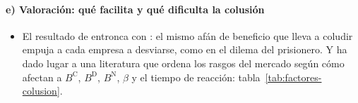 \documentclass[11pt]{article}
\begin{document}
\paragraph{e) Valoración: qué facilita y qué dificulta la colusión}

\begin{itemize}
\item El resultado de  entronca con \textcite{Stigler1964Theory}: el mismo afán de beneficio que lleva a coludir empuja a cada empresa a desviarse, como en el dilema del prisionero. Y ha dado lugar a una literatura que ordena los rasgos del mercado según cómo afectan a $B^{\mathrm C}$, $B^{\mathrm D}$, $B^{\mathrm N}$, $\beta$ y el tiempo de reacción\nocite{IvaldiEtAl2003Tacit}: tabla~\ref{tab:factores-colusion}.
\end{itemize}
\end{document}
